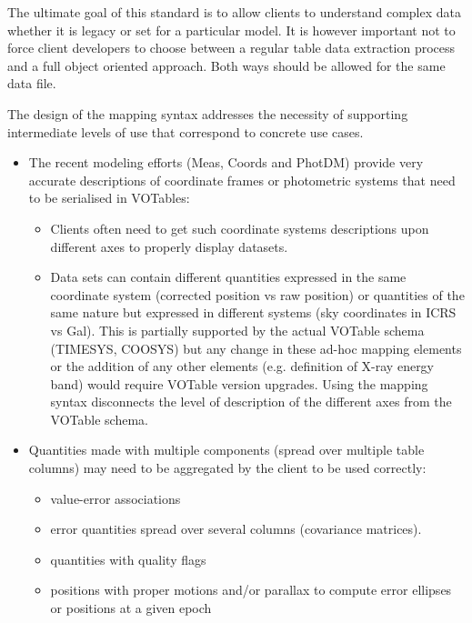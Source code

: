 
The ultimate goal of this standard is to allow clients to understand complex data whether it is legacy or set for a particular model. It is however important not to force client developers  to choose between a regular table data extraction process and a full object oriented approach. Both ways should be allowed for the same data file.

The design of the mapping syntax addresses the necessity of supporting intermediate levels of use that correspond to concrete use cases.

\begin{itemize}
  \item The recent modeling efforts (Meas, Coords and PhotDM) provide very accurate descriptions of coordinate frames or photometric 
        systems that need to be serialised in VOTables:
  \begin{itemize}
    \item Clients often need to get such coordinate systems descriptions upon different axes to properly display datasets. 
    \item Data sets can contain different quantities expressed in the same coordinate system (corrected position vs raw position) or 
          quantities of the same nature but expressed in different systems (sky coordinates in ICRS vs Gal). 
          This is partially supported by the actual VOTable schema (TIMESYS, COOSYS) but any change in these ad-hoc mapping 
          elements or the addition of any other elements (e.g. definition of X-ray energy band) would require VOTable version upgrades. 
          Using the mapping syntax disconnects the level of description of the different axes from the VOTable schema.           
  \end{itemize} 
  
  \item Quantities made with multiple components (spread over multiple table columns) may need to be aggregated by the client to be used correctly:
  \begin{itemize}
    \item value-error associations
    \item error quantities spread over several columns (covariance matrices). 
    \item quantities with quality flags
    \item positions with proper motions and/or parallax to compute error ellipses or positions at a given epoch
  \end{itemize} 


\end{itemize}

